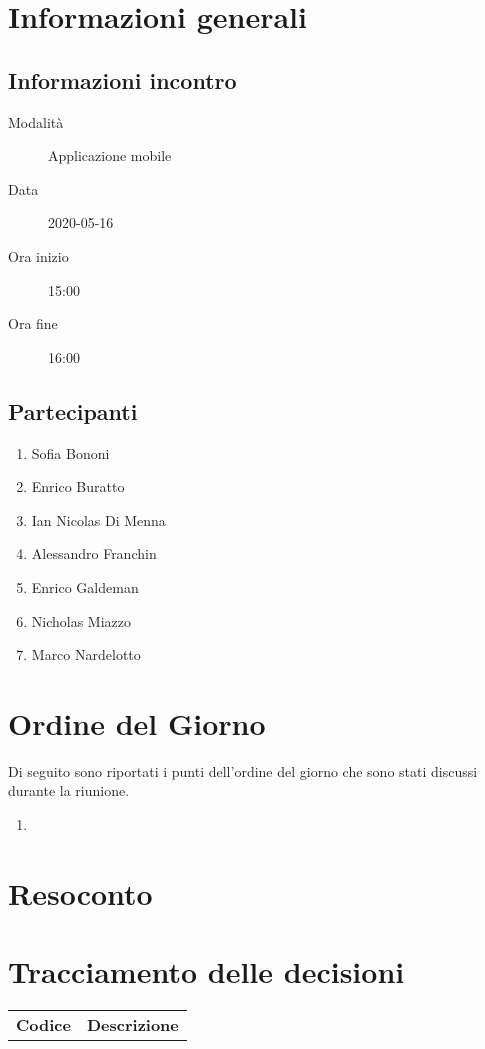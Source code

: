 \documentclass{article}
\begin{document}


\section{Informazioni generali}%
\label{sec:informazioni_generali}

\subsection{Informazioni incontro}%
\label{sub:informazioni_incontro}

\begin{description}
  \item[Modalità] Applicazione mobile 
  \item[Data] 2020-05-16
  \item[Ora inizio] 15:00
  \item[Ora fine] 16:00
\end{description}

\subsection{Partecipanti}%
\label{sub:partecipanti}

\begin{enumerate}
  \item Sofia Bononi
  \item Enrico Buratto
  \item Ian Nicolas Di Menna
  \item Alessandro Franchin
  \item Enrico Galdeman
  \item Nicholas Miazzo
  \item Marco Nardelotto
\end{enumerate}

\section{Ordine del Giorno}%
\label{ordine_del_giorno}
Di seguito sono riportati i punti dell'ordine del giorno che sono stati discussi durante la riunione.
\begin{enumerate}
  \item 
\end{enumerate}

\section{Resoconto}%
\label{resoconto}
\paragraph*{}

\section{Tracciamento delle decisioni}
\begin{table}[H]
  \centering
  \begin{tabular}{p{4cm}|p{12cm}}
    \rowcolor{lightgray}
    \textbf{Codice}  & \textbf{Descrizione}      \\
  \end{tabular}
\end{table}
\end{document}

